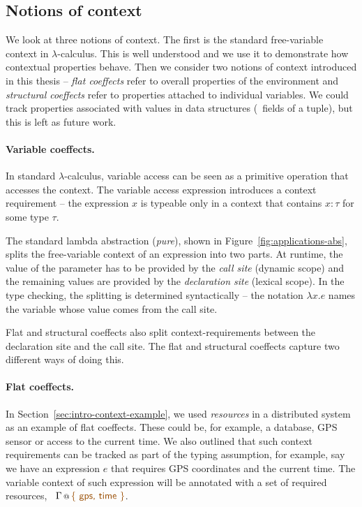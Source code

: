 \subsection{Notions of context}

We look at three notions of context. The first is the standard free-variable context in 
$\lambda$-calculus. This is well understood and we use it to demonstrate how contextual 
properties behave. Then we consider two notions of context introduced in this thesis --
\emph{flat coeffects} refer to overall properties of the environment and \emph{structural coeffects} 
refer to properties attached to individual variables. We could track properties associated
with values in data structures (\eg~fields of a tuple), but this is left as future work.

\paragraph{Variable coeffects.}

In standard $\lambda$-calculus, variable access can be seen as a primitive operation that 
accesses the context. The variable access expression introduces a context requirement -- the 
expression $x$ is typeable only in a context that contains $x:\tau$ for some type $\tau$. 

The standard lambda abstraction (\emph{pure}), shown in Figure~\ref{fig:applications-abs},
splits the free-variable context of an expression into two parts. At runtime, the value of the parameter
has to be provided by the \emph{call site} (dynamic scope) and the remaining values are provided 
by the \emph{declaration site} (lexical scope). In the type checking, the splitting is determined 
syntactically -- the notation $\lambda x.e$ names the variable whose value comes from the call site.

Flat and structural coeffects also split context-requirements between the declaration site and 
the call site. The flat and structural coeffects capture two different ways of doing this.

\paragraph{Flat coeffects.}

In Section~\ref{sec:intro-context-example}, we used \emph{resources} in a distributed system as an 
example of flat coeffects. These could be, for example, a database, GPS sensor or access to the current 
time. We also outlined that such context requirements can be tracked as part of the typing assumption,
for example, say we have an expression $e$ that requires GPS coordinates and the current time. 
The variable context of such expression will be annotated with a set of required resources, 
\ie~$\coctx{\Gamma}{ \aclrd{\ident{\{ gps, time \}}} }$.

